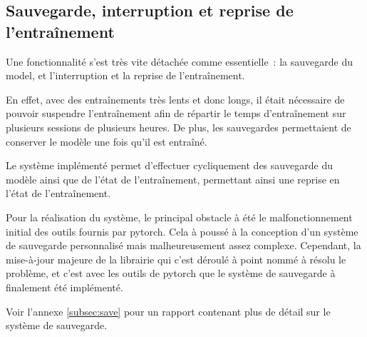 \subsection{Sauvegarde, interruption et reprise de l'entraînement}\label{subsec:gmsnn_save}
Une fonctionnalité s'est très vite détachée comme essentielle~: la sauvegarde du \gls{model}, et l'interruption et la reprise de l'entraînement.

En effet, avec des entraînements très lents et donc longs, il était nécessaire de pouvoir suspendre l'entraînement afin de répartir le temps d'entraînement sur plusieurs sessions de plusieurs heures. De plus, les sauvegardes permettaient de conserver le modèle une fois qu'il est entraîné.

Le système implémenté permet d'effectuer cycliquement des sauvegarde du modèle ainsi que de l'état de l'entraînement, permettant ainsi une reprise en l'état de l'entraînement.

Pour la réalisation du système, le principal obstacle à été le malfonctionnement initial des outils fournis par \gls{pytorch}.
Cela à poussé à la conception d'un système de sauvegarde personnalisé mais malheureusement assez complexe.
Cependant, la mise-à-jour majeure de la librairie qui c'est déroulé à point nommé à résolu le problème, et c'est avec les outils de \gls{pytorch} que le système de sauvegarde à finalement été implémenté.

Voir l'annexe \ref{subsec:save} pour un rapport contenant plus de détail sur le système de sauvegarde.